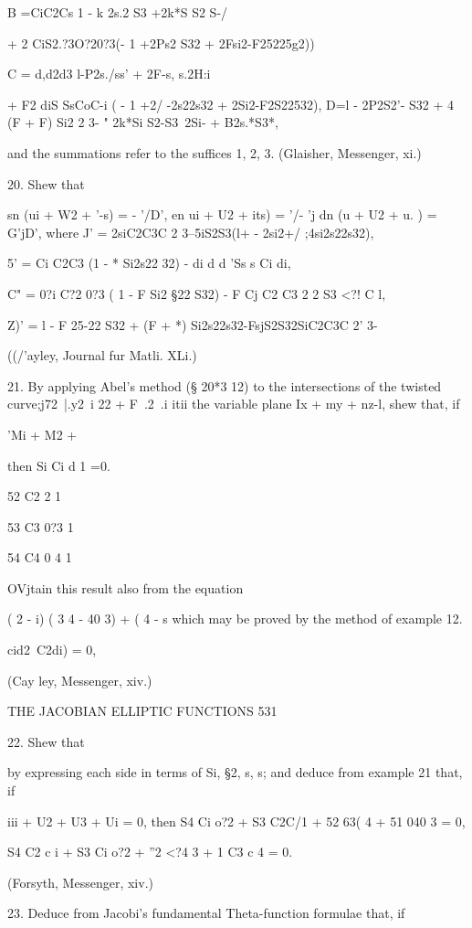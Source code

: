 B =CiC2Cs 1 - k 2s.2 S3 +2k*S S2 S-/

+ 2 CiS2.?3O?20?3(- 1 +2Ps2 S32 + 2Fsi2-F25225g2))

C = d,d2d3 l-P2s./ss' + 2F-s, s.2H:i

+ F2 diS SsCoC-i ( - 1 +2/ -2s22s32 + 2Si2-F2S22532), D=l - 2P2S2'-
S32 + 4 (F + F) Si2 2 3- " 2k*Si S2-S3~2Si- + B2s.*S3*,

and the summations refer to the suffices 1, 2, 3. (Glaisher,
Messenger, xi.)

20. Shew that

sn (ui + W2 + '-s) = - '/D', en ui + U2 + its) = '/- 'j dn (u + U2 +
u. ) = G'jD', where J' = 2siC2C3C 2 3--5iS2S3(l+ - 2si2+/
;4si2s22s32),

5' = Ci C2C3 (1 - * Si2s22 32) - di d d 'Ss s Ci di,

C" = 0?i C?2 0?3 ( 1 - F Si2 §22 S32) - F Cj C2 C3 2 2 S3 <?! C l,

Z)' = l - F 25-22 S32 + (F + *) Si2s22s32-FsjS2S32SiC2C3C 2' 3-

((/'ayley, Journal fur Matli. XLi.)

21. By applying Abel's method (§ 20*3 12) to the intersections of the
twisted curve;j72\ |.y2\ i 22 + F\ .2\ .i itii the variable plane Ix
+ my + nz-l, shew that, if

'Mi + M2 + %

then Si Ci d 1 =0.

52 C2 2 1

53 C3 0?3 1

54 C4 0 4 1

OVjtain this result also from the equation

( 2 - i) ( 3 4 - 40 3) + ( 4 - s which may be proved by the method of
example 12.

 cid2~C2di) = 0,

(Cay ley, Messenger, xiv.)

THE JACOBIAN ELLIPTIC FUNCTIONS 531

22. Shew that

by expressing each side in terms of Si, §2, s, s; and deduce from
example 21 that, if

iii + U2 + U3 + Ui = 0, then S4 Ci o?2 + S3 C2C/1 + 52 63( 4 + 51 040
3 = 0,

S4 C2 c i + S3 Ci o?2 + ''2 <?4 3 + 1 C3 c 4 = 0.

(Forsyth, Messenger, xiv.)

23. Deduce from Jacobi's fundamental Theta-function formulae that, if

